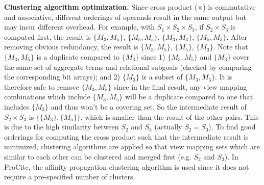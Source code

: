 


\textbf{Clustering algorithm optimization.} Since cross product ($\times$) is commutative and associative, different orderings of operands result in the same output but may incur different overhead. For example, with $S_1\times S_2 \times S_3$, if $S_2 \times S_3$ is computed first, the result is $\{M_3, M_5\}$, $\{M_5, M_5\}$, $\{M_3, M_3\}$, $\{M_5, M_3\}$. After removing obvious redundancy, the result is  $\{M_3, M_5\}$, $\{M_5\}$, $\{M_3\}$. Note that $\{M_3, M_5\}$ is a duplicate compared to $\{M_3\}$ since 1) $\{M_3, M_5\}$ and $\{M_3\}$ cover the same set of aggregate terms and relational subgoals (checked by comparing the corresponding bit arrays); and 2) $\{M_3\}$ is a subset of $\{M_3, M_5\}$. It is therefore safe to remove $\{M_3, M_5\}$ since in the final result, any view mapping combinations which include $\{M_3, M_5\}$ will be a duplicate compared to one that includes $\{M_3\}$ and thus won't be a covering set. So the intermediate result of $S_2 \times S_3$ is $\{\{M_3\}, \{M_5\}\}$, which is smaller than the result of the other pairs. This is due to the high similarity between $S_2$ and $S_3$ (actually $S_2 = S_3$). To find good orderings for computing the cross product such that the intermediate result is minimized, clustering algorithms are applied so that view mapping sets which are similar to each other can be clustered and merged first (e.g. $S_2$ and $S_3$). In ProCite, the affinity propagation clustering algorithm \cite{dueck2007non} is used since it does not require a pre-specified number of clusters.